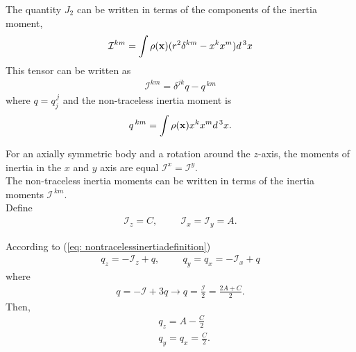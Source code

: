The quantity $J_2$ can be written in terms of the components of the inertia moment\cite{Goldstain},
\begin{align}
\label{eq: inertiamomentgeneral}
	\mathcal{I}^{km} = \int \rho(\mathbf{x}) (r^2 \delta ^{km} - x^k x^m)  d^{\hspace{0.05cm}3}x
\end{align}
This tensor can be written as
\begin{align}
\label{eq: nontracelessinertiadefinition}
	\mathcal{I}^{km}  = \delta^{jk}q - q^{\,km} 
\end{align}
where $q = q^{\,j}_j$ and the non-traceless inertia moment is \cite{Brumberg}
\begin{align}
\label{eq: nontraclessinertiamoment}
	q^{\,km} = \int \rho(\mathbf{x}) x^k x^m  d^{\hspace{0.05cm}3}x.
\end{align}

For an axially symmetric body and a rotation around the $z$-axis, the moments of inertia in the $x$ and $y$ axis are equal $\mathcal{I}^{x} =\mathcal{I}^{y} $. \\%

The non-traceless inertia moments can be written in terms of the inertia moments $\mathcal{I}^{\,km}$.\\

Define
\begin{align}
\mathcal{I}_{z} = C , \hspace{1cm}
\mathcal{I}_{x} = \mathcal{I}_{y}  = A.
\end{align}

According to (\ref{eq: nontracelessinertiadefinition})
\begin{align*}
q_{z} = -\mathcal{I}_{z} + q, \hspace{1cm}
q_{y} = q_{x} = -\mathcal{I}_{x} + q
\end{align*}
where
\begin{align*}
 q = -\mathcal{I} + 3q \rightarrow q =  \frac{\mathcal{I}}{2} = \frac{2A+C}{2}.
\end{align*}
Then, 
\begin{subequations}
\label{eq: inertiamomentobrumberchipotential}
\begin{align}
&q_{z} = A - \frac{C}{2}\\
&q_{y} = q_{x} = \frac{C}{2}.
\end{align}
\end{subequations}

